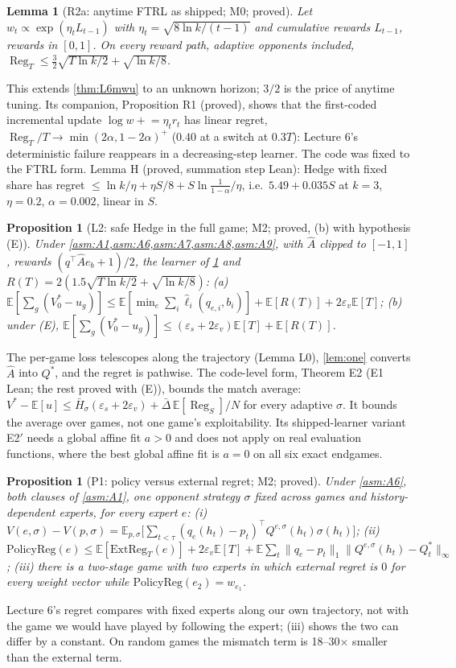 \documentclass[10pt]{article}
\theoremstyle{plain}
\newtheorem{lemma}[theorem]{Lemma}
\newtheorem{proposition}[theorem]{Proposition}
\theoremstyle{definition}
\theoremstyle{remark}
\newcommand{\E}{\mathbb{E}}
\DeclareMathOperator{\Reg}{Reg}
\newcommand{\epss}{\varepsilon_s}
\newcommand{\epsv}{\varepsilon_v}
\newcommand{\Hbar}{\bar H}
\newcommand{\Ahat}{\hat A}
\begin{document}
\begin{lemma}[R2a: anytime FTRL as shipped; M0; proved]\label{lem:R2a}
Let $w_t\propto\exp(\eta_tL_{t-1})$ with $\eta_t=\sqrt{8\ln k/(t-1)}$ and cumulative rewards $L_{t-1}$, rewards in
$[0,1]$. On every reward path, adaptive opponents included, $\Reg_T\le\tfrac32\sqrt{T\ln k/2}+\sqrt{\ln k/8}$.
\end{lemma}
This extends \cref{thm:L6mwu} to an unknown horizon; $3/2$ is the price of anytime tuning. Its companion, Proposition R1
(proved), shows that the first-coded incremental update $\log w\mathrel{+}=\eta_tr_t$ has linear regret,
$\Reg_T/T\to\min(2\alpha,1-2\alpha)^+$ ($0.40$ at a switch at $0.3T$): Lecture 6's deterministic failure reappears in a
decreasing-step learner. The code was fixed to the FTRL form. Lemma H (proved, summation step Lean): Hedge with fixed
share has regret $\le\ln k/\eta+\eta S/8+S\ln\frac1{1-\alpha}/\eta$, i.e.\ $5.49+0.035S$ at $k=3$, $\eta=0.2$,
$\alpha=0.002$, linear in $S$.

\begin{proposition}[L2: safe Hedge in the full game; M2; proved, (b) with hypothesis (E)]\label{prop:L2}
Under \cref{asm:A1,asm:A6,asm:A7,asm:A8,asm:A9}, with $\Ahat$ clipped to $[-1,1]$, rewards $(q^\top\Ahat e_b+1)/2$, the
learner of \cref{lem:R2a} and $R(T)=2(1.5\sqrt{T\ln k/2}+\sqrt{\ln k/8})$:
(a) $\E[\sum_g(V^*_0-u_g)]\le\E[\min_e\sum_i\hat\ell_i(q_{e,i},b_i)]+\E[R(T)]+2\epsv\E[T]$;
(b) under (E), $\E[\sum_g(V^*_0-u_g)]\le(\epss+2\epsv)\E[T]+\E[R(T)]$.
\end{proposition}
The per-game loss telescopes along the trajectory (Lemma L0), \cref{lem:one} converts $\Ahat$ into $Q^*$, and the
regret is pathwise. The code-level form, Theorem E2 (E1 Lean; the rest proved with (E)), bounds the match average:
$V^*-\E[u]\le\Hbar_\sigma(\epss+2\epsv)+\bar\Delta\,\E[\Reg_S]/N$ for every adaptive $\sigma$. It bounds the average over
games, not one game's exploitability. Its shipped-learner variant E2$'$ needs a global affine fit $a>0$ and does not
apply on real evaluation functions, where the best global affine fit is $a=0$ on all six exact endgames.

\begin{proposition}[P1: policy versus external regret; M2; proved]\label{prop:P1}
Under \cref{asm:A6}, both clauses of \cref{asm:A1}, one opponent strategy $\sigma$ fixed across games and
history-dependent experts, for every expert $e$:
(i) $V(e,\sigma)-V(p,\sigma)=\E_{p,\sigma}\big[\sum_{t<\tau}(q_e(h_t)-p_t)^\top Q^{e,\sigma}(h_t)\sigma(h_t)\big]$;
(ii) $\mathrm{PolicyReg}(e)\le\E[\mathrm{ExtReg}_T(e)]+2\epsv\E[T]+\E\sum_t\|q_e-p_t\|_1\|Q^{e,\sigma}(h_t)-Q^*_t\|_\infty$;
(iii) there is a two-stage game with two experts in which external regret is $0$ for every weight vector while
$\mathrm{PolicyReg}(e_2)=w_{e_1}$.
\end{proposition}
Lecture 6's regret compares with fixed experts along our own trajectory, not with the game we would have played by
following the expert; (iii) shows the two can differ by a constant. On random games the mismatch term is 18--30$\times$
smaller than the external term.
\end{document}

